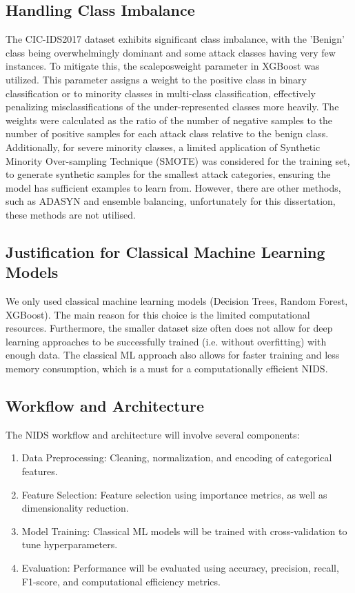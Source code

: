 \subsection{Handling Class Imbalance}
The CIC-IDS2017 dataset exhibits significant class imbalance, with the 'Benign' class being overwhelmingly dominant and some attack classes having very few instances. To mitigate this, the scale\textunderscore pos\textunderscore weight parameter in XGBoost was utilized. This parameter assigns a weight to the positive class in binary classification or to minority classes in multi-class classification, effectively penalizing misclassifications of the under-represented classes more heavily. The weights were calculated as the ratio of the number of negative samples to the number of positive samples for each attack class relative to the benign class. Additionally, for severe minority classes, a limited application of Synthetic Minority Over-sampling Technique (SMOTE) was considered for the training set, to generate synthetic samples for the smallest attack categories, ensuring the model has sufficient examples to learn from. However, there are other methods, such as ADASYN and ensemble balancing, unfortunately for this dissertation, these methods are not utilised.

\subsection{Justification for Classical Machine Learning Models} 
We only used classical machine learning models (Decision Trees, Random Forest, XGBoost). The main reason for this choice is the limited computational resources. Furthermore, the smaller dataset size often does not allow for deep learning approaches to be successfully trained (i.e. without overfitting) with enough data. The classical ML approach also allows for faster training and less memory consumption, which is a must for a computationally efficient NIDS.

\subsection{Workflow and Architecture} 
The NIDS workflow and architecture will involve several components:
\begin{enumerate} 
	\item Data Preprocessing: Cleaning, normalization, and encoding of categorical features. 
	\item Feature Selection: Feature selection using importance metrics, as well as dimensionality reduction.
	\item Model Training: Classical ML models will be trained with cross-validation to tune hyperparameters.
	\item Evaluation: Performance will be evaluated using accuracy, precision, recall, F1-score, and computational efficiency metrics.
\end{enumerate} 

